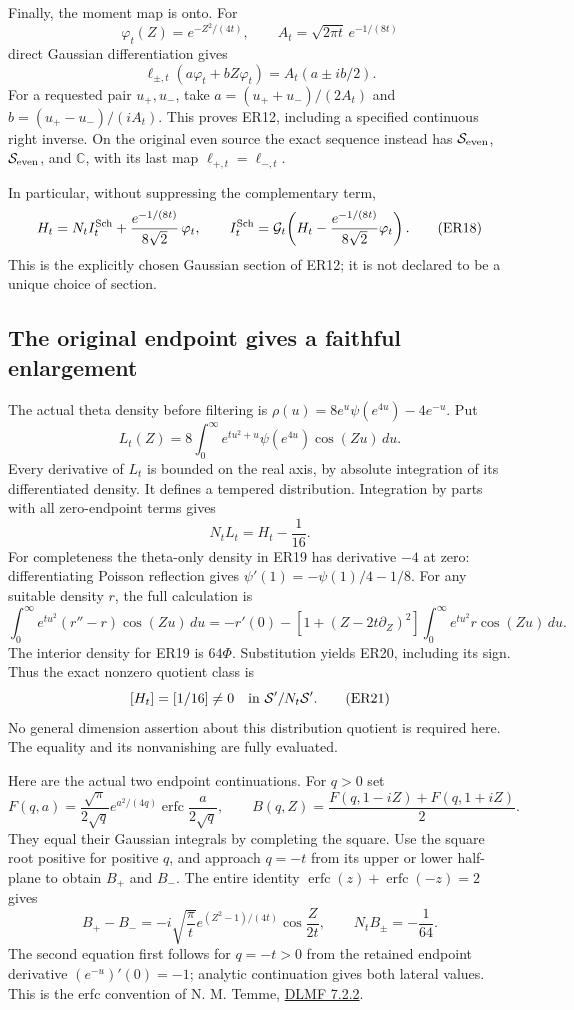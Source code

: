 Finally, the moment map is onto. For
\[
 \varphi_t(Z)=e^{-Z^2/(4t)},\qquad
 A_t=\sqrt{2\pi t}\,e^{-1/(8t)}
\]
direct Gaussian differentiation gives
\[
 \ell_{\pm,t}(a\varphi_t+bZ\varphi_t)
          =A_t(a\pm ib/2).
 \tag{ER17}
\]
For a requested pair \(u_+,u_-\), take
\(a=(u_++u_-)/(2A_t)\) and
\(b=(u_+-u_-)/(iA_t)\).
This proves ER12, including a specified continuous right inverse.
On the original even source the exact sequence instead has
\(\mathcal S_{\rm even}\), \(\mathcal S_{\rm even}\), and
\(\mathbb C\), with its last map \(\ell_{+,t}=\ell_{-,t}\).

In particular, without suppressing the complementary term,
\[
 H_t=N_t I_t^{\rm Sch}
       +\frac{e^{-1/(8t)}}{8\sqrt2}\,\varphi_t,\qquad
 I_t^{\rm Sch}=
 \mathcal G_t\!\left(H_t-
              \frac{e^{-1/(8t)}}{8\sqrt2}\varphi_t\right).
 \tag{ER18}
\]
This is the explicitly chosen Gaussian section of ER12; it is not
declared to be a unique choice of section.

\subsection{The original endpoint gives a faithful enlargement}

The actual theta density before filtering is
\(\rho(u)=8e^u\psi(e^{4u})-4e^{-u}\).
Put
\[
 L_t(Z)=8\int_0^\infty e^{tu^2+u}\psi(e^{4u})\cos(Zu)\,du .
 \tag{ER19}
\]
Every derivative of \(L_t\) is bounded on the real axis, by absolute
integration of its differentiated density. It defines a tempered
distribution. Integration by parts with all zero-endpoint terms gives
\[
 N_tL_t=H_t-\frac1{16}.
 \tag{ER20}
\]
For completeness the theta-only density in ER19 has derivative
\(-4\) at zero: differentiating Poisson reflection gives
\(\psi'(1)=-\psi(1)/4-1/8\).
For any suitable density \(r\), the full calculation is
\[
 \int_0^\infty e^{tu^2}(r''-r)\cos(Zu)\,du
       =-r'(0)-[1+(Z-2t\partial_Z)^2]
                    \int_0^\infty e^{tu^2}r\cos(Zu)\,du .
\]
The interior density for ER19 is \(64\Phi\). Substitution yields
ER20, including its sign. Thus the exact nonzero quotient class is
\[
 [H_t]=[1/16]\ne0
       \quad\hbox{in }\mathcal S'/N_t\mathcal S'.
 \tag{ER21}
\]
No general dimension assertion about this distribution quotient
is required here. The equality and its nonvanishing are fully evaluated.

Here are the actual two endpoint continuations. For \(q>0\) set
\[
 F(q,a)=\frac{\sqrt\pi}{2\sqrt q}e^{a^2/(4q)}
               \operatorname{erfc}\!\frac{a}{2\sqrt q},\qquad
 B(q,Z)=\frac{F(q,1-iZ)+F(q,1+iZ)}2.
 \tag{ER22}
\]
They equal their Gaussian integrals by completing the square.
Use the square root positive for positive \(q\), and approach
\(q=-t\) from its upper or lower half-plane to obtain \(B_+\) and
\(B_-\). The entire identity
\(\operatorname{erfc}(z)+\operatorname{erfc}(-z)=2\)
gives
\[
 B_+-B_-=-i\sqrt{\frac\pi t}
          e^{(Z^2-1)/(4t)}\cos\!\frac{Z}{2t},\qquad
 N_tB_\pm=-\frac1{64}.
 \tag{ER23}
\]
The second equation first follows for \(q=-t>0\) from the retained
endpoint derivative \((e^{-u})'(0)=-1\); analytic continuation
gives both lateral values. This is the erfc convention of
N. M. Temme, \href{https://dlmf.nist.gov/7.2.E2}{DLMF 7.2.2}.

